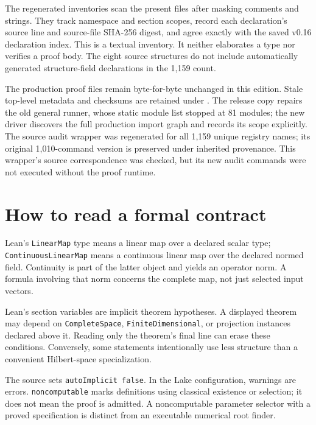 \documentclass[11pt]{article}
\begin{document}
The regenerated inventories scan the present files after masking
comments and strings. They track namespace and section scopes, record
each declaration's source line and source-file SHA-256 digest, and agree
exactly with the saved v0.16 declaration index. This is a textual
inventory. It neither elaborates a type nor verifies a proof body. The
eight source structures do not include automatically generated
structure-field declarations in the 1,159 count.

The production proof files remain byte-for-byte unchanged in this
edition. Stale top-level metadata and checksums are retained under
\texttt{}. The release
copy repairs the old general runner, whose static module list stopped at
81 modules; the new driver discovers the full production import graph
and records its scope explicitly. The source audit wrapper
\texttt{} was regenerated for all
1,159 unique registry names; its original 1,010-command version is
preserved under inherited provenance. This wrapper's source
correspondence was checked, but its new audit commands were not executed
without the proof runtime.

\hypertarget{how-to-read-a-formal-contract}{%
\section{How to read a formal
contract}\label{how-to-read-a-formal-contract}}

Lean's \texttt{LinearMap} type means a linear map over
a declared scalar type; \texttt{ContinuousLinearMap}
means a continuous linear map over the declared normed field. Continuity
is part of the latter object and yields an operator norm. A formula
involving that norm concerns the complete map, not just selected input
vectors.

Lean's section variables are implicit theorem hypotheses. A displayed
theorem may depend on \texttt{CompleteSpace},
\texttt{FiniteDimensional}, or projection instances
declared above it. Reading only the theorem's final line can erase these
conditions. Conversely, some statements intentionally use less structure
than a convenient Hilbert-space specialization.

The source sets \texttt{autoImplicit false}. In the
Lake configuration, warnings are errors.
\texttt{noncomputable} marks definitions using
classical existence or selection; it does not mean the proof is
admitted. A noncomputable parameter selector with a proved specification
is distinct from an executable numerical root finder.
\end{document}
